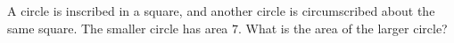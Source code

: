 A circle is inscribed in a square, and another circle is circumscribed about the same square. The smaller circle has area $7$. What is the area of the larger circle?

